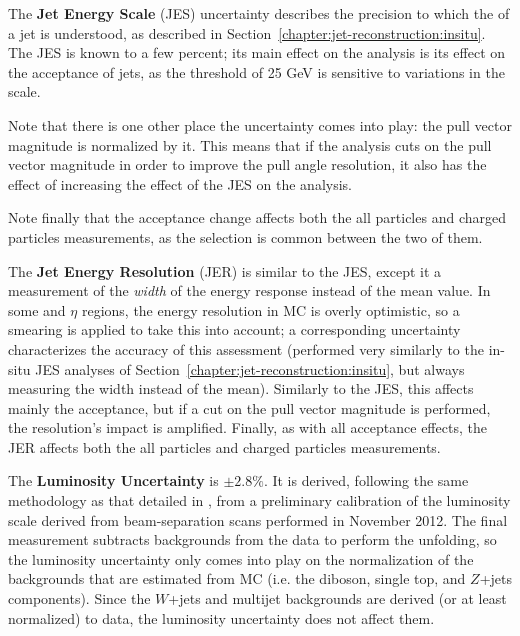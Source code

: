 
	The \textbf{Jet Energy Scale} (JES) uncertainty describes the precision to which the \pt of a jet is understood, as described in Section~\ref{chapter:jet-reconstruction:insitu}. The JES is known to a few percent; its main effect on the analysis is its effect on the acceptance of jets, as the \pt threshold of 25 GeV is sensitive to variations in the \pt scale.

	Note that there is one other place the \pt uncertainty comes into play: the pull vector magnitude is normalized by it. This means that if the analysis cuts on the pull vector magnitude in order to improve the pull angle resolution, it also has the effect of increasing the effect of the JES on the analysis.

	Note finally that the acceptance change affects both the all particles and charged particles measurements, as the selection is common between the two of them.

	The \textbf{Jet Energy Resolution} (JER) is similar to the JES, except it a measurement of the \textit{width} of the energy response instead of the mean value. In some \pt and $\eta$ regions, the energy resolution in MC is overly optimistic, so a smearing is applied to take this into account; a corresponding uncertainty characterizes the accuracy of this assessment (performed very similarly to the in-situ JES analyses of Section~\ref{chapter:jet-reconstruction:insitu}, but always measuring the width instead of the mean). Similarly to the JES, this affects mainly the acceptance, but if a cut on the pull vector magnitude is performed, the resolution's impact is amplified. Finally, as with all acceptance effects, the JER affects both the all particles and charged particles measurements.


	The \textbf{Luminosity Uncertainty} is $\pm2.8\%$. It is derived, following the same methodology as that detailed in \cite{ATLASLumi}, from a preliminary calibration of the luminosity scale derived from beam-separation scans performed in November 2012. The final measurement subtracts backgrounds from the data to perform the unfolding, so the luminosity uncertainty only comes into play on the normalization of the backgrounds that are estimated from MC (i.e. the diboson, single top, and $Z$+jets components). Since the $W$+jets and multijet backgrounds are derived (or at least normalized) to data, the luminosity uncertainty does not affect them.

